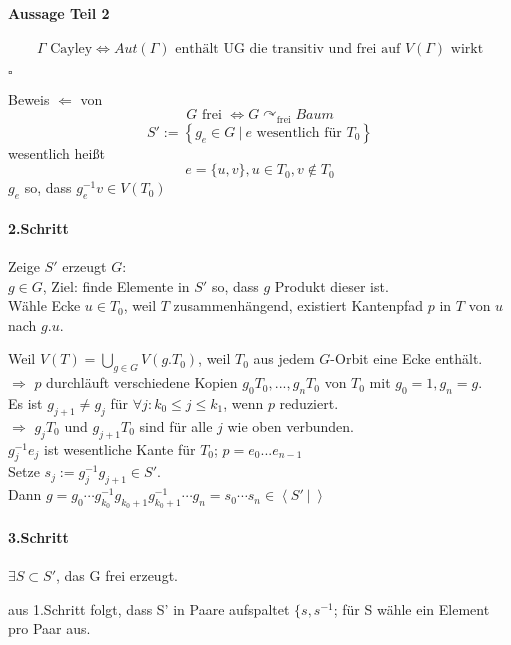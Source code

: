\documentclass{article}
\newcommand{\set}[2]{\left\lbrace #1~|~#2 \right\rbrace}
\newcommand{\grp}[2]{\left\langle #1~|~#2 \right\rangle}
\newcommand{\qed}{\hfill $\square$}
\begin{document}
\paragraph{Aussage Teil 2}
\[\Gamma \text{ Cayley} \Longleftrightarrow Aut(\Gamma) \text{ enthält UG die transitiv und frei auf } V(\Gamma) \text{ wirkt} \]

\qed


Beweis $\Longleftarrow$ von 
\[G \text{ frei } \Longleftrightarrow G \curvearrowright_\text{frei} Baum \]
\[S' := \set{g_e \in G}{e \text{ wesentlich für }T_0} \]
wesentlich heißt
\[e = \{u,v\}, u \in T_0, v \notin T_0\]
$g_e$ so, dass $g_e^{-1} v \in V(T_0)$

\paragraph{2.Schritt}
Zeige $S'$ erzeugt $G$:\\

$g\in G$, Ziel: finde Elemente in $S'$ so, dass $g$ Produkt dieser ist.\\

Wähle Ecke $u \in T_0$, weil $T$ zusammenhängend, existiert Kantenpfad $p$ in $T$ von $u$ nach $g.u$.

Weil $V(T) = \bigcup_{g\in G} V(g.T_0)$, weil $T_0$ aus jedem $G$-Orbit eine Ecke enthält.\\
$\Longrightarrow$ $p$ durchläuft verschiedene Kopien $g_0T_0, ..., g_nT_0$ von $T_0$ mit $g_0 = 1, g_n = g$.\\
Es ist $g_{j+1} \neq g_j$ für $\forall j: k_0 \leq j \leq k_1$, wenn $p$ reduziert.\\
$\Rightarrow$ $g_jT_0$ und $g_{j+1}T_0$ sind für alle $j$ wie oben verbunden.\\
$g_j^{-1} e_j$ ist wesentliche Kante für $T_0$; $p = e_0...e_{n-1}$\\
Setze $s_j := g_j^{-1}g_{j+1} \in S'$.\\
Dann $g = g_0 \cdots g_{k_0}^{-1}g_{k_0 +1} g_{k_0 +1}^{-1} \cdots g_n = s_0 \cdots s_n \in \grp{S'}{}$

\paragraph{3.Schritt}
$\exists S \subset S'$, das G frei erzeugt.

aus 1.Schritt folgt, dass S' in Paare aufspaltet $\{s, s^{-1}$; für S wähle ein Element pro Paar aus.
\end{document}
